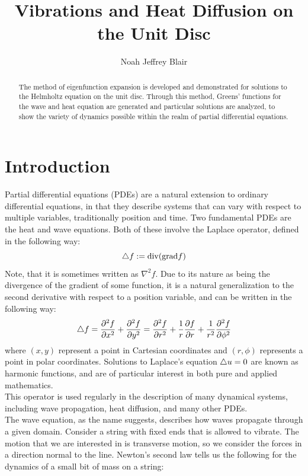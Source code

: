 \documentclass{article}
\author{Noah Jeffrey Blair}
\title{Vibrations and Heat Diffusion on the Unit Disc}
\begin{document}
\maketitle
\begin{abstract}
  The method of eigenfunction expansion is developed and demonstrated for solutions to the Helmholtz equation on the unit disc. Through this method, Greens' functions for the wave and heat equation are generated and particular solutions are analyzed, to show the variety of dynamics possible within the realm of partial differential equations.
\end{abstract}
\tableofcontents
\newpage
\section{Introduction}
Partial differential equations (PDEs) are a natural extension to  ordinary differential equations, in that they describe systems that can vary with respect to multiple variables, traditionally position and time. Two fundamental PDEs are the heat and wave equations. Both of these involve the Laplace operator, defined in the following way:
\begin{equation}
  \bigtriangleup f := \mathrm{div}(\mathrm{grad} f)
\end{equation}
Note, that it is sometimes written as $\nabla^2 f$. Due to its nature as being the divergence of the gradient of some function, it is a natural generalization to the second derivative with respect to a position variable, and can be written in the following way:
\begin{equation}
  \bigtriangleup f = \frac{\partial ^2 f}{\partial x^2}+\frac{\partial ^2 f}{\partial y^2}= \frac{\partial ^2 f}{\partial r^2}+\frac{1}{r}\frac{\partial f}{\partial r}+\frac{1}{r^2}\frac{\partial ^2 f}{\partial \phi^2}
\end{equation}
where $(x,y)$ represent a point in Cartesian coordinates and $(r,\phi)$ represents a point in polar coordinates. Solutions to Laplace's equation $\bigtriangleup u = 0$ are known as harmonic functions, and are of particular interest in both pure and applied mathematics.\\
This operator is used regularly in the description of many dynamical systems, including wave propagation, heat diffusion, and many other PDEs.\\
The wave equation, as the name suggests, describes how waves propagate through a given domain. Consider a string with fixed ends that is allowed to vibrate. The motion that we are interested in is transverse motion, so we consider the forces in a direction normal to the line. Newton's second law tells us the following for the dynamics of a small bit of mass on a string:
\end{document}
